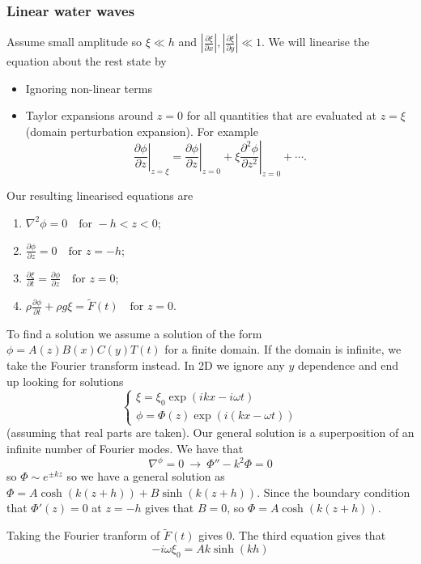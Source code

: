 \documentclass{article}
\begin{document}
\subsubsection{Linear water waves}
Assume small amplitude so $ \xi\ll h $ and $ \left|\frac{\partial \xi}{\partial x}\right|, \left|\frac{\partial \xi}{\partial y}\right|\ll 1 $. We will linearise the equation about the rest state by
\begin{itemize}
	\item Ignoring non-linear terms
	\item Taylor expansions around $ z=0 $ for all quantities that are evaluated at $ z=\xi $ (domain perturbation expansion). For example
		\[
			\left.\frac{\partial \phi}{\partial z}\right|_{z=\xi} = \left.\frac{\partial \phi}{\partial z}\right|_{z=0}+\xi\left.\frac{\partial^2\phi}{\partial z^2}\right|_{z=0} + \cdots.
		\]
\end{itemize}
Our resulting linearised equations are
\begin{enumerate}
	\item $ \nabla^2\phi = 0 \quad\text{for } -h<z<0$;
	\item $ \frac{\partial \phi}{\partial z}=0\quad\text{for } z=-h $;
	\item $ \frac{\partial \xi}{\partial t} = \frac{\partial \phi}{\partial z}\quad \text{for }z=0 $;
	\item $ \rho\frac{\partial \phi}{\partial t} + \rho g \xi =\tilde F(t)\quad\text{for } z=0 $.
\end{enumerate}
To find a solution we assume a solution of the form $ \phi = A(z)B(x)C(y)T(t) $ for a finite domain. If the domain is infinite, we take the Fourier transform instead. In 2D we ignore any $ y $ dependence and end up looking for solutions
\[
  \begin{cases}
    \xi = \xi_0 \exp(ikx-i\omega t) \\
    \phi = \Phi(z) \exp(i(kx-\omega t))
  \end{cases}
\]
(assuming that real parts are taken). Our general solution is a superposition of an infinite number of Fourier modes. We have that
\[
  \nabla^\phi = 0 \ \longrightarrow \ \Phi'' - k^2 \Phi = 0
\]
so $ \Phi \sim e^{\pm kz} $ so we have a general solution as $ \Phi = A\cosh (k(z+h)) + B\sinh(k(z+h)) $. Since the boundary condition that $ \Phi'(z) = 0 $ at $ z=-h $ gives that $ B=0 $, so $ \Phi = A\cosh(k(z+h)) $.\par
Taking the Fourier tranform of $ \tilde F(t) $ gives $ 0 $. The third equation gives that
\[
  -i\omega \xi_0 = Ak\sinh(kh)
\]
\end{document}
